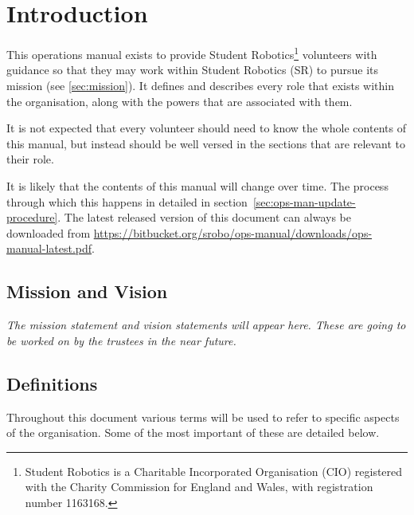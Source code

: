 \chapter{Introduction}

This operations manual exists to provide Student Robotics\footnote{Student Robotics is a Charitable Incorporated Organisation (CIO) registered with the Charity Commission for England and Wales, with registration number 1163168.} volunteers with guidance so that they may work within Student Robotics (SR) to pursue its mission (see \autoref{sec:mission}).  It defines and describes every role that exists within the organisation, along with the powers that are associated with them.

It  is not expected that every volunteer should need to know the whole contents of this manual, but instead should be well versed in the sections that are relevant to their role.

It is likely that the contents of this manual will change over time.  The process through which this happens in detailed in section~\ref{sec:ops-man-update-procedure}.  The latest released version of this document can always be downloaded from \url{https://bitbucket.org/srobo/ops-manual/downloads/ops-manual-latest.pdf}.


\section{Mission and Vision}
\label{sec:mission}

\textit{The mission statement and vision statements will appear here.  These are going to be worked on by the trustees in the near future.}

\section{Definitions}

Throughout this document various terms will be used to refer to specific aspects of the organisation. Some of the most important of these are detailed below.

